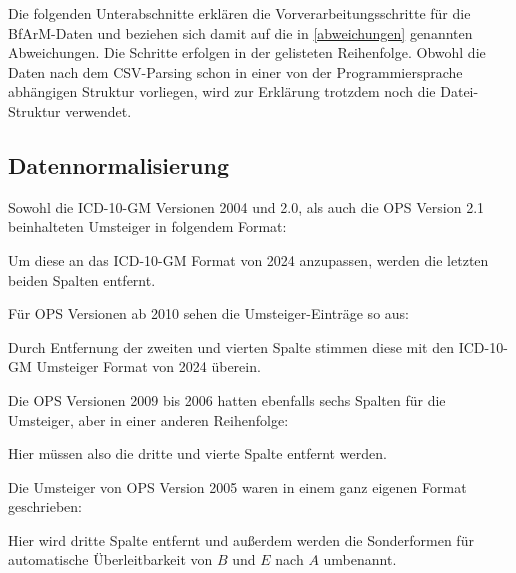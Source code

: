 Die folgenden Unterabschnitte erklären die Vorverarbeitungsschritte für die BfArM-Daten und beziehen sich damit auf die in \ref{abweichungen} genannten Abweichungen. Die Schritte erfolgen in der gelisteten Reihenfolge. Obwohl die Daten nach dem CSV-Parsing schon in einer von der Programmiersprache abhängigen Struktur vorliegen, wird zur Erklärung trotzdem noch die Datei-Struktur verwendet.

\subsection{Datennormalisierung}


Sowohl die ICD-10-GM Versionen 2004 und 2.0, als auch die OPS Version 2.1 beinhalteten Umsteiger in folgendem Format:


Um diese an das ICD-10-GM Format von 2024 anzupassen, werden die letzten beiden Spalten entfernt. 


Für OPS Versionen ab 2010 sehen die Umsteiger-Einträge so aus:


Durch Entfernung der zweiten und vierten Spalte stimmen diese mit den ICD-10-GM Umsteiger Format von 2024 überein. 


Die OPS Versionen 2009 bis 2006 hatten ebenfalls sechs Spalten für die Umsteiger, aber in einer anderen Reihenfolge:


Hier müssen also die dritte und vierte Spalte entfernt werden. 


Die Umsteiger von OPS Version 2005 waren in einem ganz eigenen Format geschrieben:


Hier wird dritte Spalte entfernt und außerdem werden die Sonderformen für automatische Überleitbarkeit von %
$B$ und $E$ nach $A$ umbenannt.  

